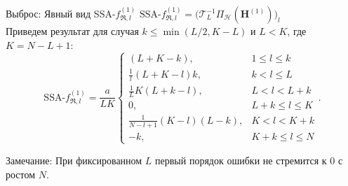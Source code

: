 \documentclass[ucs, notheorems, handout]{beamer}
\newcommand{\tX}[1]{\mathsf{#1}}
\newcommand{\iu}{\mathrm{i}\mkern1mu}
\begin{document}
\begin{frame}{Выброс: Явный вид SSA-$f^{(1)}_{\Re,l}$}
$\text{SSA-}f^{(1)}_{\Re, l} = \big( \mathcal{T}_L^{-1} \Pi_{\mathcal{H}}(\mathbf{H}^{(1)})\big)_{l}$\\
\vspace{1em}
    Приведем результат для случая $k \leq \min(L/2, K - L)$ и $L < K$, где $K=N-L+1$:
$$\text{SSA-}f^{(1)}_{\Re, l} = \frac{a}{{LK}}
\begin{cases}
	(L + K - k), & \text{$1 \leq l \leq k$}\\
	\frac{1}{l}(L + K - l)k, & \text{$k < l \leq L$}\\
	\frac{1}{L}K(L + k - l), &\text{$L < l < L + k$}\\
	0, &\text{$L + k \leq l \leq K$}\\
	\frac{1}{N - l + 1}(K - l)(L - k), &\text{$K < l < K + k$}\\
	-k, &\text{$K + k \leq l \leq N $}
\end{cases}.$$

\alert{Замечание:} При фиксированном $L$ первый порядок ошибки не стремится к $0$ с ростом $N$.
\end{frame}

\end{document}
